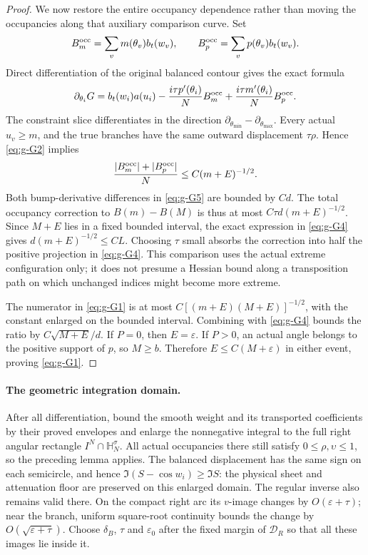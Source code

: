 \documentclass[11pt]{article}
\numberwithin{equation}{section}
\theoremstyle{remark}\newtheorem{remark}[theorem]{Remark}
\begin{document}
\begin{proof}
We now restore the entire occupancy dependence rather than
moving the occupancies along that auxiliary comparison curve.
Set
\[
 B_m^{\rm occ}=\sum_v m(\theta_v)b_t(w_v),\qquad
 B_p^{\rm occ}=\sum_v p(\theta_v)b_t(w_v).
\]
Direct differentiation of the original balanced contour gives
the exact formula
\begin{equation}\label{eq:g-G5}
\partial_{\theta_i}G
 =b_t(w_i)a(u_i)
 -\frac{i\tau p'(\theta_i)}N B_m^{\rm occ}
 +\frac{i\tau m'(\theta_i)}N B_p^{\rm occ}.
\end{equation}
The constraint slice differentiates in the direction
$\partial_{\theta_{\min}}-\partial_{\theta_{\max}}$.
Every actual $u_v\ge m$, and the true branches have the same
outward displacement $\tau\rho$.  Hence \eqref{eq:g-G2} implies
\[
 \frac{|B_m^{\rm occ}|+|B_p^{\rm occ}|}{N}
 \le C(m+E)^{-1/2}.
\]
Both bump-derivative differences in \eqref{eq:g-G5} are bounded by $Cd$.
The total occupancy correction to $B(m)-B(M)$ is thus at most
$C\tau d(m+E)^{-1/2}$.
Since $M+E$ lies in a fixed bounded interval, the exact
expression in \eqref{eq:g-G4} gives
$d(m+E)^{-1/2}\le CL$.  Choosing $\tau$ small absorbs the
correction into half the positive projection in \eqref{eq:g-G4}.
This comparison uses the actual extreme configuration only;
it does not presume a Hessian bound along a transposition path
on which unchanged indices might become more extreme.

The numerator in \eqref{eq:g-G1} is at most
$C[(m+E)(M+E)]^{-1/2}$, with the constant enlarged on the bounded interval.
Combining with \eqref{eq:g-G4} bounds the ratio by $C\sqrt{M+E}/d$.
If $P=0$, then $E=\varepsilon$.  If $P>0$, an actual angle
belongs to the positive support of $p$, so $M\ge b$.
Therefore $E\le C(M+\varepsilon)$ in either event, proving
\eqref{eq:g-G1}.
\end{proof}



\paragraph{The geometric integration domain.}\label{par:right-rectangle}
After all differentiation, bound the smooth weight and its
transported coefficients by their proved envelopes and enlarge
the nonnegative integral to the full right angular rectangle
$I^N\cap\mathbb H_N^\sigma$. All actual occupancies there still satisfy
$0\le\rho,\upsilon\le1$, so the preceding lemma applies.
The balanced displacement has the same sign on each semicircle,
and hence $\Im(S-\cos w_i)\ge\Im S$: the physical sheet and
attenuation floor are preserved on this enlarged domain.
The regular inverse also remains valid there. On the compact
right arc its $v$-image changes by $O(\varepsilon+\tau)$;
near the branch, uniform square-root continuity bounds the
change by $O(\sqrt{\varepsilon+\tau})$. Choose $\delta_B$,
$\tau$ and $\varepsilon_0$ after the fixed margin of
$\mathcal D_R$ so that all these images lie inside it.
\end{document}
